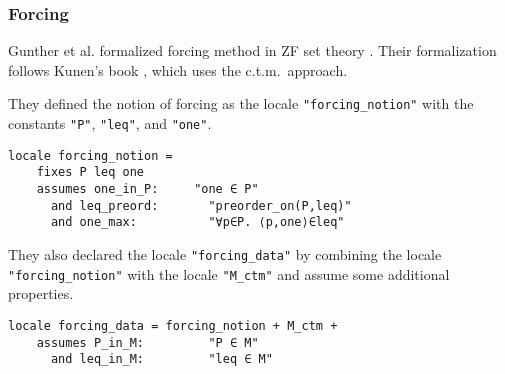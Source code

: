\documentclass{report}
\newenvironment{isaframe}{\begin{mdframed}[topline=false, rightline=false, bottomline=false]}{\end{mdframed}}
\begin{document}
\subsubsection{Forcing}
Gunther et al. formalized forcing method in ZF set theory \cite{gunther_forcing}.
Their formalization follows Kunen's book \cite{kunen2011}, which uses the c.t.m.\  approach.

They defined the notion of forcing as the locale \texttt{"forcing\_notion"} 
with the constants \texttt{"P"}, \texttt{"leq"}, and \texttt{"one"}.
\begin{isaframe}
\begin{verbatim}
locale forcing_notion =
    fixes P leq one
    assumes one_in_P:     "one ∈ P"
      and leq_preord:       "preorder_on(P,leq)"
      and one_max:          "∀p∈P. ⟨p,one⟩∈leq"
\end{verbatim}
\end{isaframe}

They also declared the locale \texttt{"forcing\_data"} 
by combining the locale \texttt{"forcing\_notion"} with the locale \texttt{"M\_ctm"} and assume some additional properties. 
\begin{isaframe}
\begin{verbatim}
locale forcing_data = forcing_notion + M_ctm +
    assumes P_in_M:         "P ∈ M"
      and leq_in_M:         "leq ∈ M"
\end{verbatim}
\end{isaframe}
\end{document}
